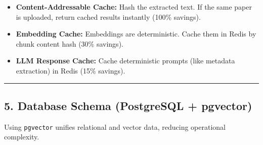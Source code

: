 \documentclass[
]{article}
\providecommand{\tightlist}{%
  \setlength{\itemsep}{0pt}\setlength{\parskip}{0pt}}
\begin{document}
\begin{itemize}
\tightlist
\item
  \textbf{Content-Addressable Cache:} Hash the extracted text. If the
  same paper is uploaded, return cached results instantly (100\%
  savings).
\item
  \textbf{Embedding Cache:} Embeddings are deterministic. Cache them in
  Redis by chunk content hash (30\% savings).
\item
  \textbf{LLM Response Cache:} Cache deterministic prompts (like
  metadata extraction) in Redis (15\% savings).
\end{itemize}

\begin{center}\rule{0.5\linewidth}{0.5pt}\end{center}

\subsection{5. Database Schema (PostgreSQL +
pgvector)}\label{database-schema-postgresql-pgvector}

Using \texttt{pgvector} unifies relational and vector data, reducing
operational complexity.
\end{document}
